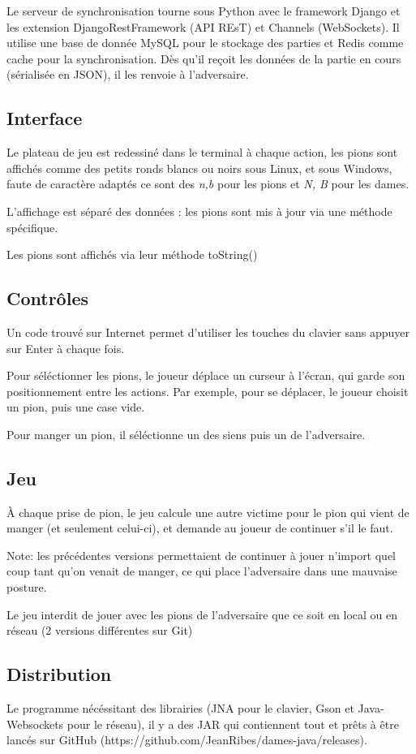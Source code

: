 \documentclass{article}
\begin{document}
Le serveur de synchronisation tourne sous Python avec le framework Django et les extension DjangoRestFramework (API REsT) et Channels (WebSockets). Il utilise une base de donnée MySQL pour le stockage des parties et Redis comme cache pour la synchronisation.
Dès qu'il reçoit les données de la partie en cours (sérialisée en JSON), il les renvoie à l'adversaire. 

\subsection{Interface}
Le plateau de jeu est redessiné dans le terminal à chaque action, les pions sont affichés comme des petits ronds blancs ou noirs sous Linux, et sous Windows, faute de caractère adaptés ce sont des \textit{n,b} pour les pions et \textit{N, B} pour les dames.

L'affichage est séparé des données : les pions sont mis à jour via une méthode spécifique.

Les pions sont affichés via leur méthode toString()
\subsection{Contrôles}
Un code trouvé sur Internet permet d'utiliser les touches du clavier sans appuyer sur Enter à chaque fois.

Pour séléctionner les pions, le joueur déplace un curseur à l'écran, qui garde son positionnement entre les actions.
Par exemple, pour se déplacer, le joueur choisit un pion, puis une case vide.

Pour manger un pion, il séléctionne un des siens puis un de l'adversaire.
\subsection{Jeu}
À chaque prise de pion, le jeu calcule une autre victime pour le pion qui vient de manger (et seulement celui-ci), et demande au joueur de continuer s'il le faut.

Note: les précédentes versions permettaient de continuer à jouer n'import quel coup tant qu'on venait de manger, ce qui place l'adversaire dans une mauvaise posture.

Le jeu interdit de jouer avec les pions de l'adversaire que ce soit en local ou en réseau (2 versions différentes sur Git)
\subsection{Distribution}
Le programme nécéssitant des librairies (JNA pour le clavier, Gson et Java-Websockets pour le réseau), il y a des JAR qui contiennent tout et prêts à être lancés sur GitHub (https://github.com/JeanRibes/dames-java/releases).
\\
\end{document}
